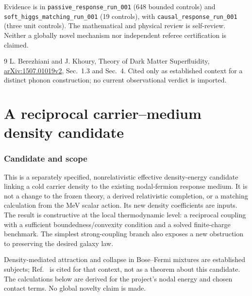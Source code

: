 \documentclass[11pt]{article}
\begin{document}
Evidence is in \texttt{passive\_response\_run\_001} (648 bounded controls)
and \texttt{soft\_higgs\_matching\_run\_001} (19 controls), with
\texttt{causal\_response\_run\_001} (three unit controls).
The mathematical and physical review is self-review. Neither a globally
novel mechanism nor independent referee
certification is claimed.

\begin{thebibliography}{9}
 L. Berezhiani and J. Khoury,
Theory of Dark Matter Superfluidity,
\href{https://arxiv.org/html/1507.01019v2}{arXiv:1507.01019v2},
Sec.~1.3 and Sec.~4. Cited only as established context for a distinct
phonon construction; no current observational verdict is imported.
\end{thebibliography}

\clearpage

\part{A reciprocal carrier--medium density candidate}

\section{Candidate and scope}
This is a separately specified, nonrelativistic effective density-energy
candidate linking a cold carrier density to the existing nodal-fermion
response medium. It is not a change to the frozen theory, a derived
relativistic completion, or a matching calculation from the MeV scalar
action. Its new density coefficients are inputs. The result is constructive
at the local thermodynamic level: a reciprocal coupling with a sufficient
boundedness/convexity condition and a solved finite-charge benchmark.
The simplest strong-coupling branch also exposes a new obstruction to
preserving the desired galaxy law.

Density-mediated attraction and collapse in Bose--Fermi mixtures are
established subjects; Ref.~\cite{rb:mixture} is cited for that context,
not as a theorem about this candidate. The calculations below are derived
for the project's nodal energy and chosen contact terms. No global novelty
claim is made.
\end{document}

